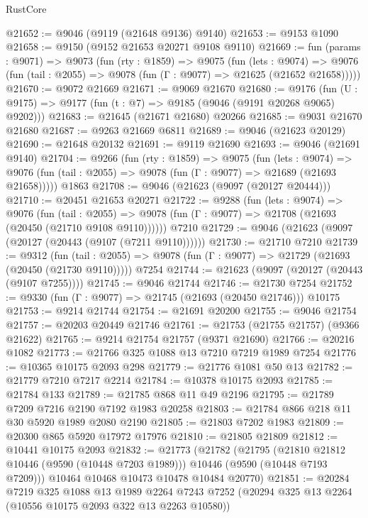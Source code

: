 \begin{lexlean}{RustCore}
\begin{coremodule}
@21652 := @9046 (@9119 (@21648 @9136) @9140)
@21653 := @9153 @1090
@21658 := @9150 (@9152 @21653 @20271 @9108 @9110)
@21669 := fun (params : @9071) =>
  @9073
    (fun (rty : @1859) =>
    @9075
      (fun (lets : @9074) =>
      @9076 (fun (tail : @2055) => @9078 (fun (Γ : @9077) => @21625 (@21652 @21658)))))
@21670 := @9072 @21669
@21671 := @9069 @21670
@21680 := @9176
    (fun (U : @9175) => @9177 (fun (t : @7) => @9185 (@9046 (@9191 @20268 @9065) @9202)))
@21683 := @21645 (@21671 @21680) @20266
@21685 := @9031 @21670 @21680
@21687 := @9263 @21669 @6811
@21689 := @9046 (@21623 @20129)
@21690 := @21648 @20132
@21691 := @9119 @21690
@21693 := @9046 (@21691 @9140)
@21704 := @9266
    (fun (rty : @1859) =>
    @9075
      (fun (lets : @9074) =>
      @9076 (fun (tail : @2055) => @9078 (fun (Γ : @9077) => @21689 (@21693 @21658)))))
    @1863
@21708 := @9046 (@21623 (@9097 (@20127 @20444)))
@21710 := @20451 @21653 @20271
@21722 := @9288
    (fun (lets : @9074) =>
    @9076
      (fun (tail : @2055) =>
      @9078 (fun (Γ : @9077) => @21708 (@21693 (@20450 (@21710 @9108 @9110))))))
    @7210
@21729 := @9046 (@21623 (@9097 (@20127 (@20443 (@9107 (@7211 @9110))))))
@21730 := @21710 @7210
@21739 := @9312
    (fun (tail : @2055) => @9078 (fun (Γ : @9077) => @21729 (@21693 (@20450 (@21730 @9110)))))
    @7254
@21744 := @21623 (@9097 (@20127 (@20443 (@9107 @7255))))
@21745 := @9046 @21744
@21746 := @21730 @7254
@21752 := @9330 (fun (Γ : @9077) => @21745 (@21693 (@20450 @21746))) @10175
@21753 := @9214 @21744
@21754 := @21691 @20200
@21755 := @9046 @21754
@21757 := @20203 @20449 @21746
@21761 := @21753 (@21755 @21757) (@9366 @21622)
@21765 := @9214 @21754 @21757 (@9371 @21690)
@21766 := @20216 @1082
@21773 := @21766 @325 @1088 @13 @7210 @7219 @1989 @7254
@21776 := @10365 @10175 @2093 @298
@21779 := @21776 @1081 @50 @13
@21782 := @21779 @7210 @7217 @2214
@21784 := @10378 @10175 @2093
@21785 := @21784 @133
@21789 := @21785 @868 @11 @49 @2196
@21795 := @21789 @7209 @7216 @2190 @7192 @1983 @20258
@21803 := @21784 @866 @218 @11 @30 @5920 @1989 @2080 @2190
@21805 := @21803 @7202 @1983
@21809 := @20300 @865 @5920 @17972 @17976
@21810 := @21805 @21809
@21812 := @10441 @10175 @2093
@21832 := @21773
    (@21782
      (@21795
        (@21810 @21812 @10446 (@9590 (@10448 @7203 @1989)))
        @10446
        (@9590 (@10448 @7193 @7209)))
      @10464
      @10468
      @10473
      @10478
      @10484
      @20770)
@21851 := @20284
    @7219
    @325
    @1088
    @13
    @1989
    @2264
    @7243
    @7252
    (@20294 @325 @13 @2264 (@10556 @10175 @2093 @322 @13 @2263 @10580))

\end{coremodule}
\end{lexlean}
